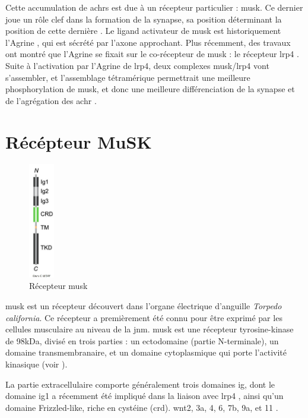 	Cette accumulation de \glspl{achr} est due à un récepteur particulier : \gls{musk}. Ce dernier joue un rôle clef dans la formation de la synapse, sa position déterminant la position de cette dernière \cite{DeChiara1996, Glass1996}. Le ligand activateur de \gls{musk} est historiquement l'Agrine \cite{Glass1996}, qui est sécrété par l'axone approchant. Plus récemment, des travaux ont montré que l'Agrine se fixait sur le co-récepteur de \gls{musk} : le récepteur \gls{lrp4} \cite{Zhang2008, Kim2008}. Suite à l'activation par l'Agrine de \gls{lrp4}, deux complexes \gls{musk}/\gls{lrp4} vont s'assembler, et l'assemblage tétramérique permettrait une meilleure phosphorylation de \gls{musk}, et donc une meilleure différenciation de la synapse et de l'agrégation des \gls{achr} \cite{Zong2012}.
	
\section{Récépteur MuSK}
	\label{sec:IntroMuSK}
	
	\begin{figure}
		\includegraphics[width=0.1\textwidth]{./Images/MuSKReceptor.png}	
		\caption{Récepteur \gls{musk}}
		\label{fig:RMuSK}
	\end{figure}

	\gls{musk} est un récepteur découvert dans l'organe électrique d'anguille \emph{Torpedo california}. Ce récepteur a premièrement été connu pour être exprimé par les cellules musculaire au niveau de la \gls{jnm}. \gls{musk} est une récepteur tyrosine-kinase de 98kDa, divisé en trois parties : un ectodomaine (partie N-terminale), un domaine transmembranaire, et un domaine cytoplasmique qui porte l'activité kinasique (voir ). 
	
	La partie extracellulaire comporte généralement trois domaines \gls{ig}, dont le domaine \gls{ig}1 a récemment été impliqué dans la liaison avec \gls{lrp4} \cite{Zhang2011}, ainsi qu'un domaine Frizzled-like, riche en cystéine (\gls{crd}). \gls{wnt}2, 3a, 4, 6, 7b, 9a, et 11 \cite{Stiegler2009}. 
	
